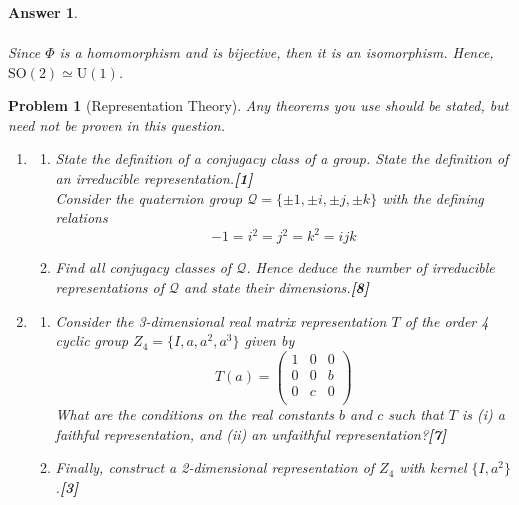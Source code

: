 \documentclass[a4paper]{article}
\newtheorem{ans}{Answer}[section]
\theoremstyle{new}
\newtheorem{qns}{Problem}[section]
\begin{document}
\begin{ans}
\begin{enumerate}[label=(\roman*)]
\begin{align}
\end{align}
Since $\Phi$ is a homomorphism and is bijective, then it is an isomorphism. Hence, $\text{SO}(2)\simeq\text{U}(1)$.
\end{enumerate}
\end{ans}
\newpage
\begin{qns}[Representation Theory]
Any theorems you use should be stated, but need not be proven in this question.
\begin{enumerate}[label=(\roman*)]
\item 
\begin{enumerate}[label=(\alph*)]
\item State the definition of a conjugacy class of a group. State the definition of an
irreducible representation.\hfill\textbf{[1]}\\[5pt]
Consider the quaternion group $\mathcal{Q} = \{\pm 1,\pm i,\pm j,\pm k\}$ with the defining relations
$$−1 = i^2 = j^2 = k^2 = ijk$$
\item Find all conjugacy classes of $\mathcal{Q}$. Hence deduce the number of irreducible representations of $\mathcal{Q}$ and state their dimensions.\hfill\textbf{[8]}
\end{enumerate}
\item 
\begin{enumerate}[label=(\alph*)]
\item Consider the 3-dimensional real matrix representation $T$ of the order 4 cyclic
group $Z_4 = \{I, a, a^2, a^3\}$ given by
$$T(a)=\begin{pmatrix}1&0&0\\0&0&b\\0&c&0\\\end{pmatrix}$$
What are the conditions on the real constants $b$ and $c$ such that $T$ is (i) a faithful representation, and (ii) an unfaithful representation?\hfill\textbf{[7]}
\item
Finally, construct a 2-dimensional representation of $Z_4$ with kernel $\{I, a^2\}$.\hfill\textbf{[3]}
\end{enumerate}
\end{enumerate}
\end{qns}
\end{document}
